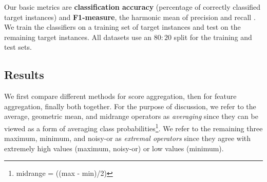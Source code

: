 \documentclass[conference]{IEEEtran}
\begin{document}
%



Our basic metrics are \textbf{classification accuracy} (percentage of correctly classified target instances) and \textbf{F1-measure}, the harmonic mean of precision and recall \cite{Witten2005}. We train the classifiers on a training set of target instances and test on the remaining target instances. All datasets use an $80:20$ split for the training and test sets.



\subsection{Results}

We first compare different methods for score aggregation, then for feature aggregation, finally both together. For the purpose of discussion, we refer to the average, geometric mean, and midrange operators as {\em averaging} since they can be viewed as a form of averaging class probabilities\footnote{midrange = ((max - min)/2)}. We refer to the remaining three maximum, minimum, and noisy-or as {\em extremal operators} since they agree with extremely high values (maximum, noisy-or) or low values (minimum).
\end{document}
